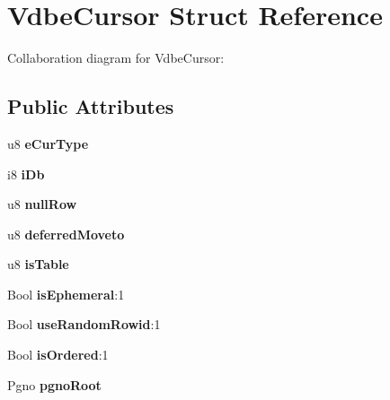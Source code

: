 \hypertarget{structVdbeCursor}{}\section{Vdbe\+Cursor Struct Reference}
\label{structVdbeCursor}


Collaboration diagram for Vdbe\+Cursor\+:
\subsection*{Public Attributes}
\begin{DoxyCompactItemize}
\item 
u8 {\bfseries e\+Cur\+Type}\hypertarget{structVdbeCursor_a6128af438b1faa2d175eeb754af1a9c2}{}\label{structVdbeCursor_a6128af438b1faa2d175eeb754af1a9c2}

\item 
i8 {\bfseries i\+Db}\hypertarget{structVdbeCursor_ace3e5ef31acdc9bca7b080da2af493a1}{}\label{structVdbeCursor_ace3e5ef31acdc9bca7b080da2af493a1}

\item 
u8 {\bfseries null\+Row}\hypertarget{structVdbeCursor_a564d1df8b7bf6df90b1c07c97d7b23ff}{}\label{structVdbeCursor_a564d1df8b7bf6df90b1c07c97d7b23ff}

\item 
u8 {\bfseries deferred\+Moveto}\hypertarget{structVdbeCursor_ad6c9d21da881287364a1a3f90285a7e9}{}\label{structVdbeCursor_ad6c9d21da881287364a1a3f90285a7e9}

\item 
u8 {\bfseries is\+Table}\hypertarget{structVdbeCursor_ab6c2642afb560159a06cffbe7aa98619}{}\label{structVdbeCursor_ab6c2642afb560159a06cffbe7aa98619}

\item 
Bool {\bfseries is\+Ephemeral}\+:1\hypertarget{structVdbeCursor_ac13d003d1cf017f3e44897de29a7c2cb}{}\label{structVdbeCursor_ac13d003d1cf017f3e44897de29a7c2cb}

\item 
Bool {\bfseries use\+Random\+Rowid}\+:1\hypertarget{structVdbeCursor_a067fff911d6d37190785a0cf5ba4fc8e}{}\label{structVdbeCursor_a067fff911d6d37190785a0cf5ba4fc8e}

\item 
Bool {\bfseries is\+Ordered}\+:1\hypertarget{structVdbeCursor_a8d9e802372b801c4eb5aef6340cfa21a}{}\label{structVdbeCursor_a8d9e802372b801c4eb5aef6340cfa21a}

\item 
Pgno {\bfseries pgno\+Root}\hypertarget{structVdbeCursor_aaff39caaa6bada9b2cd27dbc1fd2a5fc}{}\label{structVdbeCursor_aaff39caaa6bada9b2cd27dbc1fd2a5fc}


\end{DoxyCompactItemize}
